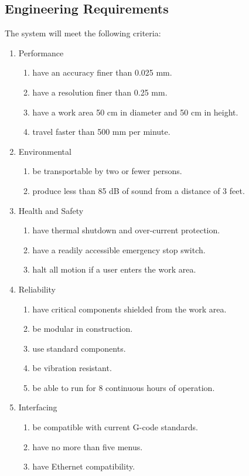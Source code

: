 \subsection{Engineering Requirements}
The system will meet the following criteria:
\begin{enumerate} \parskip2pt
	\item Performance
	\begin{enumerate}
		\item have an accuracy finer than 0.025 mm.
		\item have a resolution finer than 0.25 mm.
		\item have a work area 50 cm in diameter and 50 cm in height.
		\item travel faster than 500 mm per minute.
	\end{enumerate}

	\item Environmental
	\begin{enumerate}
		\item be transportable by two or fewer persons.
		\item produce less than 85 dB of sound from a distance of 3 feet.
	\end{enumerate}

	\item Health and Safety
	\begin{enumerate}
		\item have thermal shutdown and over-current protection.
		\item have a readily accessible emergency stop switch.
		\item halt all motion if a user enters the work area.
	\end{enumerate}

	\item Reliability
	\begin{enumerate}
		\item have critical components shielded from the work area.
		\item be modular in construction.
		\item use standard components.
		\item be vibration resistant.
		\item be able to run for 8 continuous hours of operation.
	\end{enumerate}

	\item Interfacing
	\begin{enumerate}
		\item be compatible with current G-code standards.
		\item have no more than five menus.
		\item have Ethernet compatibility.
	\end{enumerate}
\end{enumerate}

